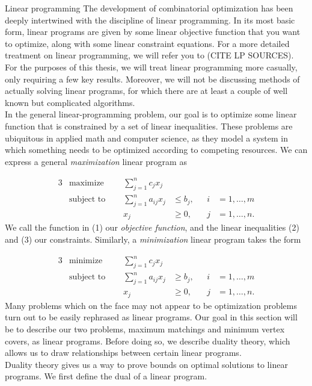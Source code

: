 \documentclass[11pt]{article}
\renewcommand{\'}{^{'}}
\begin{document}
\begin{section}{Linear programming}
	The development of combinatorial optimization has been deeply intertwined with the discipline 
	of linear programming. In its most basic form, linear programs are given by some linear 
	objective function that you want to optimize, along with some linear constraint equations. 
	For a more detailed treatment on linear programming, we will refer you to (CITE LP SOURCES).
	For the purposes of this thesis, we will treat linear programming more casually, only requiring 
	a few key results. Moreover, we will not be discussing methods of actually solving linear 
	programs, for which there are at least a couple of well known but complicated algorithms. \\
	In the general linear-programming problem, our goal is to optimize some linear function that 
	is constrained by a set of linear inequalities. These problems are ubiquitous in applied math 
	and computer science, as they model a system in which something needs to be optimized according 
	to competing resources. We can express a general \emph{maximization} linear program as

	\begin{alignat}{3}
		& \text{maximize } & \sum_{j=1}^{n} c_{j} x_{j}& \\
		& \text{subject to } \quad & \sum_{j=1}^{n} a_{ij} x_{j} & \leq b_{j}, & i & = 1, \dots 
		, m \\
				&& x_{j} & \geq 0, \quad & j & = 1, \dots, n.
	\end{alignat}
	We call the function in (1) our \emph{objective function}, and the linear inequalities (2) and 
	(3) our constraints. Similarly, a \emph{minimization} linear program takes the form

	\begin{alignat}{3}
		& \text{minimize } & \sum_{j=1}^{n} c_{j} x_{j}& \\
		& \text{subject to } \quad & \sum_{j=1}^{n} a_{ij} x_{j} & \geq b_{j}, & i & = 1, \dots 
		, m \\
				&& x_{j} & \geq 0, \quad & j & = 1, \dots, n.
	\end{alignat}
	Many problems which on the face may not appear to be optimization problems turn out to be 
	easily rephrased as linear programs. Our goal in this section will 
	be to describe our two problems, maximum matchings and minimum vertex covers, as linear 
	programs. Before doing so, we describe duality theory, which allows us to draw relationships 
	between certain linear programs.\\
	Duality theory gives us a way to prove bounds on optimal solutions to linear programs. We first 
	define the dual of a linear program.


\end{section}
\end{document}
